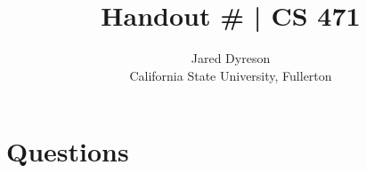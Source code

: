 \documentclass{article}
\title{Handout \#<++> | CS 471}
\author{Jared Dyreson\\ 
        California State University, Fullerton}
\begin{document}
\maketitle
\tableofcontents

\newpage

\section{Questions}
\end{document}
